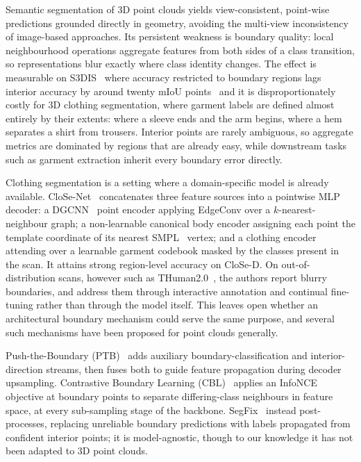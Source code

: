 \documentclass{article}
\theoremstyle{plain}
\theoremstyle{definition}
\theoremstyle{remark}
\begin{document}
Semantic segmentation of 3D point clouds yields view-consistent, point-wise
predictions grounded directly in geometry, avoiding the multi-view
inconsistency of image-based approaches. Its persistent weakness is boundary
quality: local neighbourhood operations aggregate features from both sides of
a class transition, so representations blur exactly where class identity
changes. The effect is measurable on S3DIS~\cite{https://doi.org/10.57761/gk3g-wc33} where accuracy restricted to boundary
regions lags interior accuracy by around twenty mIoU points~\cite{tang2022contrastive} and
it is disproportionately costly for 3D clothing segmentation, where garment
labels are defined almost entirely by their extents: where a sleeve ends and
the arm begins, where a hem separates a shirt from trousers. Interior points
are rarely ambiguous, so aggregate metrics are dominated by regions that are
already easy, while downstream tasks such as garment extraction inherit every boundary error directly.

Clothing segmentation is a setting where a domain-specific model is
already available. CloSe-Net~\cite{antic2024close} concatenates three feature
sources into a pointwise MLP decoder: a DGCNN~\cite{wang2019dynamicgraphcnnlearning} point encoder
applying EdgeConv over a $k$-nearest-neighbour graph; a non-learnable
canonical body encoder assigning each point the template coordinate of its
nearest SMPL~\cite{SMPL:2015} vertex; and a clothing encoder attending over a
learnable garment codebook masked by the classes present in the scan. It
attains strong region-level accuracy on CloSe-D. On out-of-distribution scans,
however such as THuman2.0~\cite{tao2021function4d}, the authors report blurry
boundaries, and address them through interactive annotation and continual
fine-tuning rather than through the model itself. This leaves
open whether an architectural boundary mechanism could serve the same purpose,
and several such mechanisms have been proposed for point clouds generally.

Push-the-Boundary (PTB)~\cite{Du_2022} adds auxiliary boundary-classification and
interior-direction streams, then fuses both to guide feature propagation
during decoder upsampling. Contrastive Boundary Learning (CBL)~\cite{tang2022contrastive}
applies an InfoNCE objective at boundary points to separate differing-class
neighbours in feature space, at every sub-sampling stage of the backbone.
SegFix~\cite{yuan2020segfixmodelagnosticboundaryrefinement} instead post-processes, replacing unreliable boundary
predictions with labels propagated from confident interior points; it is
model-agnostic, though to our knowledge it has not been adapted to 3D point
clouds.
\end{document}
